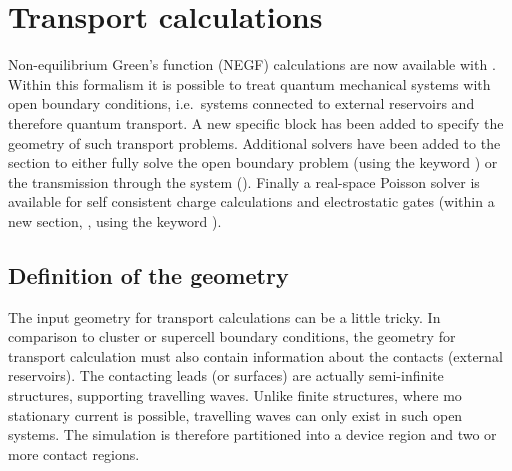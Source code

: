 
\chapter{Transport calculations}
\label{app:transp}

Non-equilibrium Green's function (NEGF) calculations are now available with
{\dftbp}. Within this formalism it is possible to treat quantum mechanical
systems with open boundary conditions, i.e.\ systems connected to external
reservoirs and therefore quantum transport.  A new specific 
block has been added to specify the geometry of such transport problems.
Additional solvers have been added to the  section to either
fully solve the open boundary problem (using the keyword )
or the transmission through the system (). Finally a
real-space Poisson solver is available for self consistent charge calculations
and electrostatic gates (within a new section, , using the
keyword ).

\section{Definition of the geometry}

The input geometry for transport calculations can be a little tricky. In
comparison to cluster or supercell boundary conditions, the geometry for
transport calculation must also contain information about the contacts (external
reservoirs). The contacting leads (or surfaces) are actually semi-infinite
structures, supporting travelling waves. Unlike finite structures, where mo
stationary current is possible, travelling waves can only exist in such open
systems.  The simulation is therefore partitioned into a device region and two
or more contact regions.


